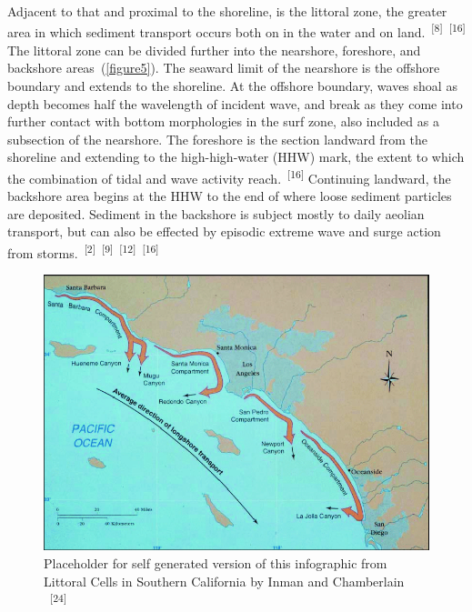 \documentclass{article}
\begin{document}

\par{Adjacent to that and proximal to the shoreline, is the littoral zone, the greater area in which sediment transport occurs both on in the water and on land.~\textsuperscript{[8]}~\textsuperscript{[16]} The littoral zone can be divided further into the nearshore, foreshore, and backshore areas~(\cref{figure5}). The seaward limit of the nearshore is the offshore boundary and extends to the shoreline. At the offshore boundary, waves shoal as depth becomes half the wavelength of incident wave, and break as they come into further contact with bottom morphologies in the surf zone, also included as a subsection of the nearshore. The foreshore is the section landward from the shoreline and extending to the high-high-water (HHW) mark, the extent to which the combination of tidal and wave activity reach.~\textsuperscript{[16]} Continuing landward, the backshore area begins at the HHW to the end of where loose sediment particles are deposited. Sediment in the backshore is subject mostly to daily aeolian transport, but can also be effected by episodic extreme wave and surge action from storms.~\textsuperscript{[2]}~\textsuperscript{[9]}~\textsuperscript{[12]}~\textsuperscript{[16]}}


\begin{figure}
    \centering
    \includegraphics[width=.9\linewidth]{images/so-cal-littoral-cells.png}
    \caption{Placeholder for self generated version of this infographic from Littoral Cells in Southern California by Inman and Chamberlain ~\textsuperscript{[24]}}
    \label{figure6}
\end{figure}
\end{document}
